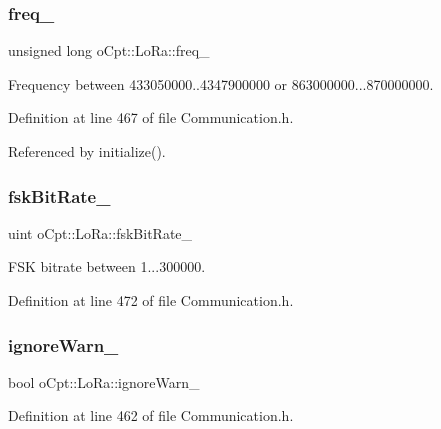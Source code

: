 \subsubsection{\texorpdfstring{freq\+\_\+}{freq\_}}
{\footnotesize\ttfamily unsigned long o\+Cpt\+::\+Lo\+Ra\+::freq\+\_\+\hspace{0.3cm}{\ttfamily [protected]}}



Frequency between 433050000..4347900000 or 863000000...870000000. 



Definition at line 467 of file Communication.\+h.



Referenced by initialize().

\hypertarget{classo_cpt_1_1_lo_ra_ae8fc701f0418461263bc0049e95ab01e}{}\label{classo_cpt_1_1_lo_ra_ae8fc701f0418461263bc0049e95ab01e} 
\subsubsection{\texorpdfstring{fsk\+Bit\+Rate\+\_\+}{fskBitRate\_}}
{\footnotesize\ttfamily uint o\+Cpt\+::\+Lo\+Ra\+::fsk\+Bit\+Rate\+\_\+\hspace{0.3cm}{\ttfamily [protected]}}



F\+SK bitrate between 1...300000. 



Definition at line 472 of file Communication.\+h.

\hypertarget{classo_cpt_1_1_lo_ra_af293c469e9badc01ef82415211f729da}{}\label{classo_cpt_1_1_lo_ra_af293c469e9badc01ef82415211f729da} 
\subsubsection{\texorpdfstring{ignore\+Warn\+\_\+}{ignoreWarn\_}}
{\footnotesize\ttfamily bool o\+Cpt\+::\+Lo\+Ra\+::ignore\+Warn\+\_\+\hspace{0.3cm}{\ttfamily [protected]}}



Definition at line 462 of file Communication.\+h.



